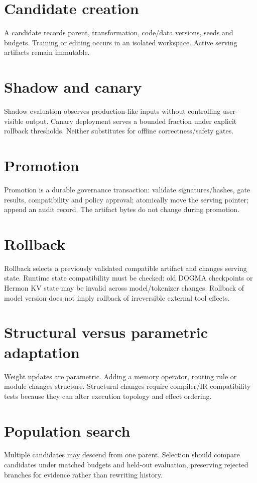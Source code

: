 \section{Candidate creation}
A candidate records parent, transformation, code/data versions, seeds and budgets. Training or editing occurs in an isolated workspace. Active serving artifacts remain immutable.

\section{Shadow and canary}
Shadow evaluation observes production-like inputs without controlling user-visible output. Canary deployment serves a bounded fraction under explicit rollback thresholds. Neither substitutes for offline correctness/safety gates.

\section{Promotion}
Promotion is a durable governance transaction: validate signatures/hashes, gate results, compatibility and policy approval; atomically move the serving pointer; append an audit record. The artifact bytes do not change during promotion.

\section{Rollback}
Rollback selects a previously validated compatible artifact and changes serving state. Runtime state compatibility must be checked: old DOGMA checkpoints or Hermon KV state may be invalid across model/tokenizer changes. Rollback of model version does not imply rollback of irreversible external tool effects.

\section{Structural versus parametric adaptation}
Weight updates are parametric. Adding a memory operator, routing rule or module changes structure. Structural changes require compiler/IR compatibility tests because they can alter execution topology and effect ordering.

\section{Population search}
Multiple candidates may descend from one parent. Selection should compare candidates under matched budgets and held-out evaluation, preserving rejected branches for evidence rather than rewriting history.

